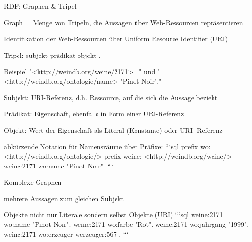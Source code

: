 \documentclass[a4paper]{article}
\begin{document}
\begin{multicols}{3}
\begin{itemize*}
        RDF: Graphen \& Tripel
        \begin{itemize*}
            \item Graph = Menge von Tripeln, die Aussagen über Web-Ressourcen repräsentieren
            \item Identifikation der Web-Ressourcen über Uniform Resource Identifier (URI)
            \item Tripel: subjekt prädikat objekt .
            \item Beispiel "<http://weindb.org/weine/2171> \ " und "<http://weindb.org/ontologie/name> "Pinot Noir"."
            \item Subjekt: URI-Referenz, d.h. Ressource, auf die sich die Aussage bezieht
            \item Prädikat: Eigenschaft, ebenfalls in Form einer URI-Referenz
            \item Objekt: Wert der Eigenschaft als Literal (Konstante) oder URI- Referenz
            \item abkürzende Notation für Namensräume über Präfixe:
            ```sql
            prefix wo: <http://weindb.org/ontologie/>
            prefix weine: <http://weindb.org/weine/>
            weine:2171 wo:name "Pinot Noir".
            ```
            \item Komplexe Graphen
            \begin{itemize*}
                \item mehrere Aussagen zum gleichen Subjekt
                \item Objekte nicht nur Literale sondern selbst Objekte (URI)
                ```sql
                weine:2171 wo:name "Pinot Noir".
                weine:2171 wo:farbe "Rot".
                weine:2171 wo:jahrgang "1999".
                weine:2171 wo:erzeuger werzeuger:567 .
                ```
            \end{itemize*}
        \end{itemize*}


\end{itemize*}
\end{multicols}
\end{document}
